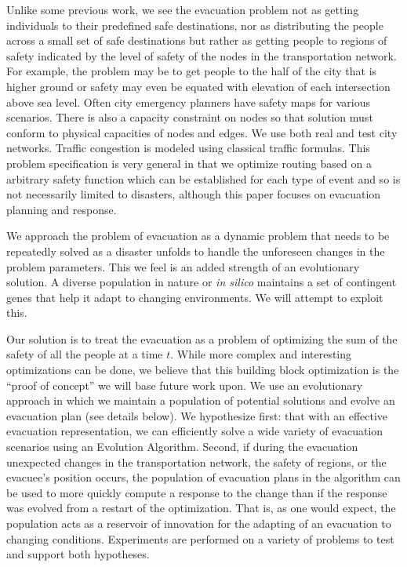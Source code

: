 \documentclass{sig-alternate-05-2015}
\begin{document}
Unlike some previous work, we see the evacuation problem not as
getting individuals to their predefined safe destinations, nor as
distributing the people across a small set of safe destinations but
rather as getting people to regions of safety indicated by the level
of safety of the nodes in the transportation network.  For example,
the problem may be to get people to the half of the city that is
higher ground or safety may even be equated with elevation of each
intersection above sea level.  Often city emergency planners have
safety maps for various scenarios. There is also a capacity constraint
on nodes so that solution must conform to physical capacities of nodes
and edges.  We use both real and test city networks.  Traffic
congestion is modeled using classical traffic formulas.
This problem specification is very
general in that we optimize routing based on a arbitrary safety
function which can be established for each type of event and so is not
necessarily limited to disasters, although this paper focuses on
evacuation planning and response.

We approach the problem of evacuation as a dynamic problem that needs
to be repeatedly solved as a disaster unfolds to handle the unforeseen
changes in the problem parameters.  This we feel is an added strength
of an evolutionary solution.  A diverse population in nature or
\textit{in silico} maintains a set of contingent genes that help it
adapt to changing environments.  We will attempt to exploit this.

Our solution is to treat the evacuation as a problem of optimizing the
sum of the safety of all the people at a time $t$.  While more complex
and interesting optimizations can be done, we believe that this
building block optimization is the ``proof of concept'' we will base
future work upon.  We use an evolutionary approach in which we
maintain a population of potential solutions and evolve an evacuation
plan (see details below).  We hypothesize first: that with an
effective evacuation representation, we can efficiently solve a wide
variety of evacuation scenarios using an Evolution Algorithm.  Second,
if during the evacuation unexpected changes in the transportation
network, the safety of regions, or the evacuee's position occurs, the
population of evacuation plans in the algorithm can be used to more
quickly compute a response to the change than if the response was
evolved from a restart of the optimization.
That is, as one would expect, the population
acts as a reservoir of innovation for the adapting of an evacuation to
changing conditions.  Experiments are performed on a variety of
problems to test and support both hypotheses.
\end{document}
